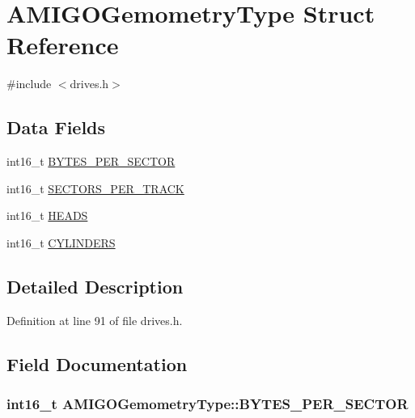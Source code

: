 \hypertarget{structAMIGOGemometryType}{}\section{A\+M\+I\+G\+O\+Gemometry\+Type Struct Reference}
\label{structAMIGOGemometryType}


{\ttfamily \#include $<$drives.\+h$>$}

\subsection*{Data Fields}
\begin{DoxyCompactItemize}
\item 
int16\+\_\+t \hyperlink{structAMIGOGemometryType_a38dc0b559f00c78f30fe0c43c53b582a}{B\+Y\+T\+E\+S\+\_\+\+P\+E\+R\+\_\+\+S\+E\+C\+T\+OR}
\item 
int16\+\_\+t \hyperlink{structAMIGOGemometryType_a9ac647c76bd331ab5b1fd22a4f5b9a4a}{S\+E\+C\+T\+O\+R\+S\+\_\+\+P\+E\+R\+\_\+\+T\+R\+A\+CK}
\item 
int16\+\_\+t \hyperlink{structAMIGOGemometryType_a33131d3948935e2064af9af151653033}{H\+E\+A\+DS}
\item 
int16\+\_\+t \hyperlink{structAMIGOGemometryType_a4282aeb6c4aac3b8cfc09e29402dcd3f}{C\+Y\+L\+I\+N\+D\+E\+RS}
\end{DoxyCompactItemize}


\subsection{Detailed Description}


Definition at line 91 of file drives.\+h.



\subsection{Field Documentation}
\subsubsection[{\texorpdfstring{B\+Y\+T\+E\+S\+\_\+\+P\+E\+R\+\_\+\+S\+E\+C\+T\+OR}{BYTES_PER_SECTOR}}]{\setlength{\rightskip}{0pt plus 5cm}int16\+\_\+t A\+M\+I\+G\+O\+Gemometry\+Type\+::\+B\+Y\+T\+E\+S\+\_\+\+P\+E\+R\+\_\+\+S\+E\+C\+T\+OR}\hypertarget{structAMIGOGemometryType_a38dc0b559f00c78f30fe0c43c53b582a}{}\label{structAMIGOGemometryType_a38dc0b559f00c78f30fe0c43c53b582a}


